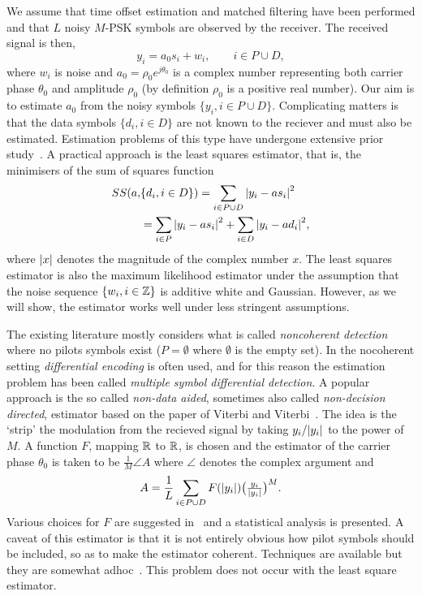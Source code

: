 \documentclass[journal]{IEEEtran}
\begin{document}
We assume that time offset estimation and matched filtering have been performed and that $L$ noisy $M$-PSK symbols are observed by the receiver.  The received signal is then,
\begin{equation}\label{eq:sigmod}
y_i = a_0 s_i + w_i, \qquad i \in P \cup D,
\end{equation}
where $w_i$ is noise and $a_0 = \rho_0 e^{j\theta_0}$ is a complex number representing both carrier phase $\theta_0$ and amplitude $\rho_0$ (by definition $\rho_0$ is a positive real number).  Our aim is to estimate $a_0$ from the noisy symbols $\{ y_i, i \in P \cup D \}$.  Complicating matters is that the data symbols $\{d_i, i \in D\}$ are not known to the reciever and must also be estimated.  Estimation problems of this type have undergone extensive prior study~\cite{ViterbiViterbi_phase_est_1983,Cowley_ref_sym_carr_1998,Wilson1989,Makrakis1990,Liu1991,Mackenthun1994,Sweldens2001,McKilliamLinearTimeBlockPSK2009}.  A practical approach is the least squares estimator, that is, the minimisers of the sum of squares function
\begin{align*}
SS(a, &\{d_i, i \in D\}) = \sum_{i \in P \cup D} {\left\vert  y_i - a s_i  \right\vert}^2 \\
&= \sum_{i \in P} {\left\vert  y_i - a s_i  \right\vert}^2 + \sum_{i \in D} {\left\vert  y_i - a d_i  \right\vert}^2,
\end{align*}
where ${\left\vert x \right\vert}$ denotes the magnitude of the complex number $x$.  The least squares estimator is also the maximum likelihood estimator under the assumption that the noise sequence $\{w_i, i \in {\mathbb Z}\}$ is additive white and Gaussian.  However, as we will show, the estimator works well under less stringent assumptions.  %

The existing literature mostly considers what is called \emph{noncoherent detection} where no pilots symbols exist ($P = \emptyset$ where $\emptyset$ is the empty set).  In the nocoherent setting \emph{differential encoding} is often used, and for this reason the estimation problem has been called \emph{multiple symbol differential detection}.  A popular approach is the so called \emph{non-data aided}, sometimes also called \emph{non-decision directed}, estimator based on the paper of Viterbi and Viterbi~\cite{ViterbiViterbi_phase_est_1983}.  The idea is the `strip' the modulation from the recieved signal by taking $y_i / {\left\vert y_i \right\vert}$ to the power of $M$.  A function $F$, mapping ${\mathbb R}$ to ${\mathbb R}$, is chosen and the estimator of the carrier phase $\theta_0$ is taken to be $\tfrac{1}{M}\angle{A}$ where $\angle$ denotes the complex argument and
\[
A = \frac{1}{L}\sum_{i \in P \cup D} F({\left\vert y_i \right\vert}) \big(\tfrac{y_i}{{\left\vert y_i \right\vert}}\big)^M.
\]
Various choices for $F$ are suggested in~\cite{ViterbiViterbi_phase_est_1983} and a statistical analysis is presented.  A caveat of this estimator is that it is not entirely obvious how pilot symbols should be included, so as to make the estimator coherent. Techniques are available but they are somewhat adhoc~\cite{Cowley_ref_sym_carr_1998}.  This problem does not occur with the least square estimator.
\end{document}
